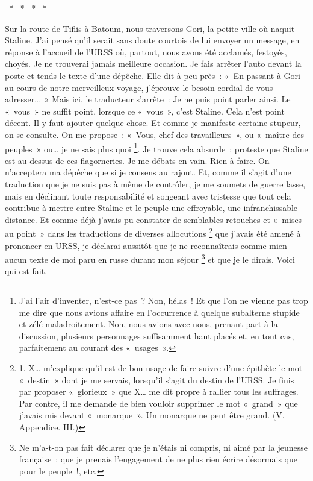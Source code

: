 \documentclass[french,twoside]{book} %
\begin{document}
{\centering \noindent *  *  *  *  *\par}
\noindent Sur la route de Tiflis à Batoum, nous traversons Gori, la petite ville où naquit Staline. J’ai pensé qu’il serait sans doute courtois de lui envoyer un message, en réponse à l’accueil de l’URSS où, partout, nous avons été acclamés, festoyés, choyés. Je ne trouverai jamais meilleure occasion. Je fais arrêter l’auto devant la poste et tends le texte d’une dépêche. Elle dit à peu près : « En passant à Gori au cours de notre merveilleux voyage, j’éprouve le besoin cordial de vous adresser… » Mais ici, le traducteur s’arrête : Je ne puis point parler ainsi. Le « vous » ne suffit point, lorsque ce « vous », c’est Staline. Cela n’est point décent. Il y faut ajouter quelque chose. Et comme je manifeste certaine stupeur, on se consulte. On me propose : « Vous, chef des travailleurs », ou « maître des peuples » ou… je ne sais plus quoi \footnote{J’ai l’air d’inventer, n’est-ce pas ? Non, hélas ! Et que l’on ne vienne pas trop me dire que nous avions affaire en l’occurrence à quelque subalterne stupide et zélé maladroitement. Non, nous avions avec nous, prenant part à la discussion, plusieurs personnages suffisamment haut placés et, en tout cas, parfaitement au courant des « usages ».}. Je trouve cela absurde ; proteste que Staline est au-dessus de ces flagorneries. Je me débats en vain. Rien à faire. On n’acceptera ma dépêche que si je consens au rajout. Et, comme il s’agit d’une traduction que je ne suis pas à même de contrôler, je me soumets de guerre lasse, mais en déclinant toute responsabilité et songeant avec tristesse que tout cela contribue à mettre entre Staline et le peuple une effroyable, une infranchissable distance. Et comme déjà j’avais pu constater de semblables retouches et « mises au point » dans les traductions de diverses allocutions \footnote{1. X… m’explique qu’il est de bon usage de faire suivre d’une épithète le mot « destin » dont je me servais, lorsqu’il s’agit du destin de l’URSS. Je finis par proposer « glorieux » que X… me dit propre à rallier tous les suffrages. Par contre, il me demande de bien vouloir supprimer le mot « grand » que j’avais mis devant « monarque ». Un monarque ne peut être grand. (V. Appendice. III.)} que j’avais été amené à prononcer en URSS, je déclarai aussitôt que je ne reconnaîtrais comme mien aucun texte de moi paru en russe durant mon séjour \footnote{Ne m’a-t-on pas fait déclarer que je n’étais ni compris, ni aimé par la jeunesse française ; que je prenais l’engagement de ne plus rien écrire désormais que pour le peuple !, etc.} et que je le dirais. Voici qui est fait.\par
\end{document}
